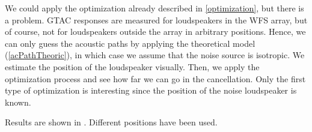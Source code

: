 We could apply the optimization already described in \autoref{optimization}, but there is a problem. GTAC responses are measured for loudspeakers in the WFS array, but of course, not for loudspeakers outside the array in arbitrary positions. Hence, we can only guess the acoustic paths by applying the theoretical model (\autoref{acPathTheoric}), in which case we assume that the noise source is isotropic. We estimate the position of the loudspeaker visually. Then, we apply the optimization process and see how far we can go in the cancellation. Only the first type of optimization is interesting since the position of the noise loudspeaker is known.

Results are shown in . Different positions have been used.






